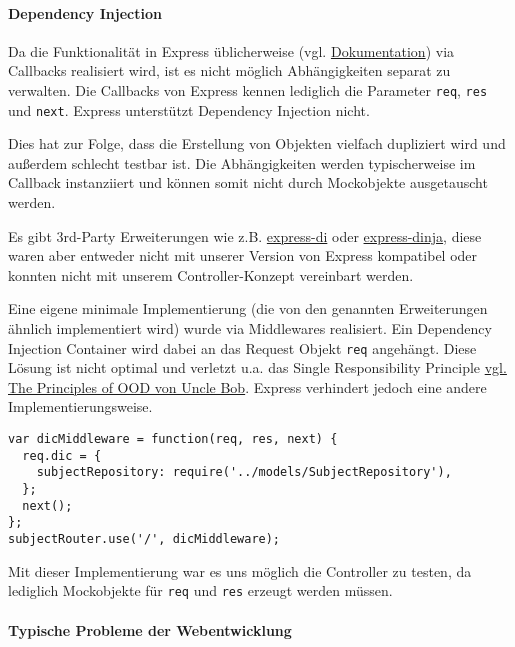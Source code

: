 \paragraph{Dependency Injection}\label{dependency-injection}

Da die Funktionalität in Express üblicherweise (vgl.
\href{http://expressjs.com/en/starter/basic-routing.html}{Dokumentation})
via Callbacks realisiert wird, ist es nicht möglich Abhängigkeiten
separat zu verwalten. Die Callbacks von Express kennen lediglich die
Parameter \texttt{req}, \texttt{res} und \texttt{next}. Express
unterstützt Dependency Injection nicht.

Dies hat zur Folge, dass die Erstellung von Objekten vielfach dupliziert
wird und außerdem schlecht testbar ist. Die Abhängigkeiten werden
typischerweise im Callback instanziiert und können somit nicht durch
Mockobjekte ausgetauscht werden.

Es gibt 3rd-Party Erweiterungen wie z.B.
\href{https://github.com/luin/express-di}{express-di} oder
\href{https://github.com/floatdrop/express-dinja}{express-dinja}, diese
waren aber entweder nicht mit unserer Version von Express kompatibel
oder konnten nicht mit unserem Controller-Konzept vereinbart werden.

Eine eigene minimale Implementierung (die von den genannten
Erweiterungen ähnlich implementiert wird) wurde via Middlewares
realisiert. Ein Dependency Injection Container wird dabei an das Request
Objekt \texttt{req} angehängt. Diese Lösung ist nicht optimal und
verletzt u.a. das Single Responsibility Principle
\href{http://www.butunclebob.com/ArticleS.UncleBob.PrinciplesOfOod}{vgl.
The Principles of OOD von Uncle Bob}. Express verhindert jedoch eine
andere Implementierungsweise.

\begin{verbatim}
var dicMiddleware = function(req, res, next) {
  req.dic = {
    subjectRepository: require('../models/SubjectRepository'),
  };
  next();
};
subjectRouter.use('/', dicMiddleware);
\end{verbatim}

Mit dieser Implementierung war es uns möglich die Controller zu testen,
da lediglich Mockobjekte für \texttt{req} und \texttt{res} erzeugt
werden müssen.

\paragraph{Typische Probleme der
Webentwicklung}\label{typische-probleme-der-webentwicklung}

